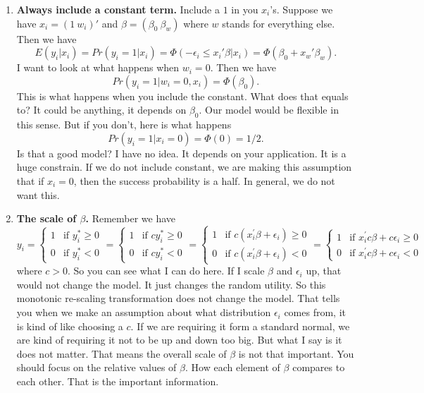 \documentclass[11pt,a4paper]{amsart}
\theoremstyle{plain}
\theoremstyle{definition}
\begin{document}
	\begin{enumerate}
		\item \textbf{Always include a constant term.} Include a $1$ in you $x_{i}$'s. Suppose we have $x_{i} = (1 ~ w_{i})'$ and $\beta = (\beta_{0} ~ \beta_{w})$ where $w$ stands for everything else. Then we have 
		\[	E(y_{i} | x_{i}) = Pr(y_{i}=1 | x_{i}) = \Phi(-\epsilon_{i} \leq x_{i}'\beta | x_{i}) = \Phi(\beta_{0} + x_{w}' \beta_{w}).	\]
		I want to look at what happens when $w_{i} = 0$. Then we have 
		\[	Pr(y_{i} = 1 | w_{i} = 0, x_{i}) = \Phi(\beta_{0}).	\]
		This is what happens when you include the constant. What does that equals to? It could be anything, it depends on $\beta_{0}$. Our model would be flexible in this sense. But if you don't, here is what happens
		\[			Pr(y_{i} = 1 | x_{i} = 0) = \Phi(0) = 1/2.		\]
		Is that a good model?  I have no idea. It depends on your application.  It is a huge constrain. If we do not include constant, we are making this assumption that if $x_{i} = 0$, then the success probability is a half. In general, we do not want this.
		\item \textbf{The scale of $\beta$.} Remember we have 
		\[	y_{i} = \begin{cases}
		1 &\text{if $y^{*}_{i} \geq 0$} \\
		0 &\text{if $y^{*}_{i} < 0$} 
		\end{cases}	=
		\begin{cases}
		1 &\text{if $cy^{*}_{i} \geq 0$} \\
		0 &\text{if $cy^{*}_{i} < 0$} 
		\end{cases} =
		\begin{cases}
		1 &\text{if $c(x^{'}_{i}\beta + \epsilon_{i})\geq 0$} \\
		0 &\text{if $c(x^{'}_{i}\beta + \epsilon_{i}) < 0$} 
		\end{cases}=
		\begin{cases}
		1 &\text{if $x^{'}_{i}c\beta + c\epsilon_{i}\geq 0$} \\
		0 &\text{if $x^{'}_{i}c\beta + c\epsilon_{i} < 0$} 
		\end{cases}
		\]
		where $c > 0$. So you can see what I can do here. If I scale $\beta$ and $\epsilon_{i}$ up, that would not change the model. It just changes the random utility.  So this monotonic re-scaling transformation does not change the model. That tells you when we make an assumption about what distribution $\epsilon_{i}$ comes from, it is kind of like choosing a $c$. If we are requiring it form a standard normal, we are kind of requiring it not to be up and down too big. But what I say is it does not matter. That means the overall scale of $\beta$ is not that important. You should focus on the relative values of $\beta$. How each element of $\beta$ compares to each other. That is the important information. 
	\end{enumerate} 
\end{document}
